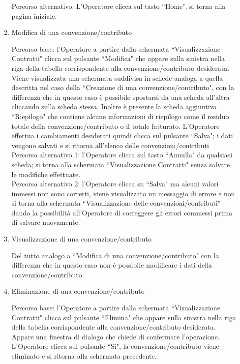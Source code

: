 \begin{enumerate}
\begin{enumerate}
  Percorso alternativo:
  L'Operatore clicca sul tasto ``Home", si torna alla pagina iniziale.
 
  \item Modifica di una convenzione/contributo\\ \label{UC_edit_contract}
  
  Percorso base:
  l'Operatore a partire dalla schermata ``Visualizzazione Contratti" clicca sul pulsante ``Modifica" che appare sulla sinistra nella riga 
  della tabella corrispondente alla convenzione/contributo desiderata. Viene visualizzata una schermata suddivisa in schede analoga a quella
  descritta nel caso della ``Creazione di una convenzione/contributo", con la differenza che in questo caso è possibile spostarsi da una scheda all'altra
  cliccando sulla scheda stessa. Inoltre è presente la scheda aggiuntiva ``Riepilogo" che contiene alcune informazioni di riepilogo come il residuo
  totale della convenzione/contributo o il totale fatturato.
  L'Operatore effettua i cambiamenti desiderati quindi clicca sul pulsante ``Salva"; i dati vengono salvati e si ritorna all'elenco delle convenzioni/contributi\\

  Percorso alternativo 1:
  l'Operatore clicca sul tasto \textquotedblleft Annulla" da qualsiasi scheda;  si torna alla schermata \textquotedblleft Visualizzazione Contratti" senza salvare le modifiche effettuate.\\
  
  Percorso alternativo 2:
  l'Operatore clicca su \textquotedblleft Salva" ma alcuni valori immessi non sono corretti, viene visualizzato un messaggio di errore e non si torna alla schermata \textquotedblleft Visualizzazione delle
  convenzioni/contributi" dando la possibilità all'Operatore di correggere gli errori commessi prima di salvare nuovamente.
  
  \item Visualizzazione di una convenzione/contributo\\ \label{UC_view_contract}
 
  Del tutto analogo a ``Modifica di una convenzione/contributo" con la differenza che in questo caso non è possibile modificare i dati della
  convenzione/contributo.
  
  \item Eliminazione di una convenzione/contributo\\ \label{UC_delete_contract}
  
  Percorso base:
  l'Operatore a partire dalla schermata ``Visualizzazione Contratti" clicca sul pulsante ``Elimina" che appare sulla sinistra nella riga 
  della tabella corrispondente alla convenzione/contributo desiderata. Appare una finestra di dialogo che chiede di confermare l'operazione. L'Operatore clicca sul pulsante ``Sì", la convenzione/contributo viene eliminato e si
  ritorna alla schermata precedente.
  

\end{enumerate}
\end{enumerate}
